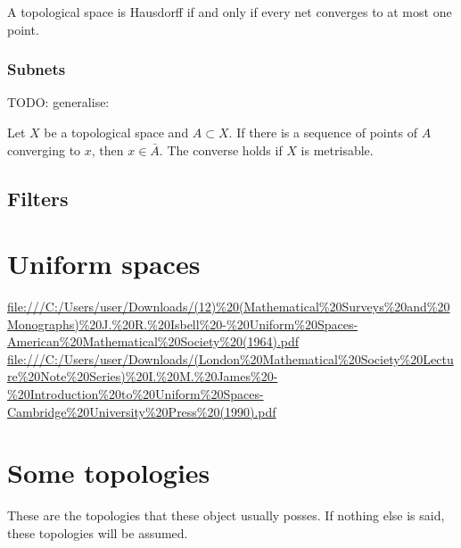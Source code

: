 \begin{proposition}
A topological space is Hausdorff \textup{if and only if} every net converges to at most one point.
\end{proposition}

\subsection{Subnets}

TODO: generalise:
\begin{proposition}
Let $X$ be a topological space and $A\subset X$. If there is a sequence of points of $A$ converging to $x$, then $x\in\bar{A}$. The converse holds if $X$ is metrisable.
\end{proposition}

\section{Filters}


\chapter{Uniform spaces}
\url{file:///C:/Users/user/Downloads/(12)%20(Mathematical%20Surveys%20and%20Monographs)%20J.%20R.%20Isbell%20-%20Uniform%20Spaces-American%20Mathematical%20Society%20(1964).pdf}
\url{file:///C:/Users/user/Downloads/(London%20Mathematical%20Society%20Lecture%20Note%20Series)%20I.%20M.%20James%20-%20Introduction%20to%20Uniform%20Spaces-Cambridge%20University%20Press%20(1990).pdf}




\chapter{Some topologies}
These are the topologies that these object usually posses. If nothing else is said, these topologies will be assumed.

